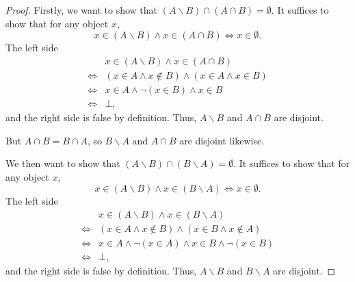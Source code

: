 \begin{proof}
    Firstly, we want to show that $(A\backslash B)\cap (A\cap B)=\emptyset$. It suffices to show that for any object $x$, \[x\in (A\backslash B) \land x \in (A\cap B) \iff x \in \emptyset.\] The left side 
    \begin{align*}
        & x\in (A\backslash B) \land x \in (A\cap B)
        \\\iff& (x\in A \land x \notin B) \land (x\in A \land x\in B)
        \\\iff& x\in A \land \lnot (x\in B) \land x\in B
        \\\iff& \bot,
    \end{align*}
    and the right side is false by definition. Thus, $A\backslash B$ and $A\cap B$ are disjoint.

    But $A\cap B = B\cap A$, so $B\backslash A$ and $A\cap B$ are disjoint likewise.

    We then want to show that $(A\backslash B)\cap (B\backslash A)=\emptyset$. It suffices to show that for any object $x$, \[x\in (A\backslash B) \land x \in (B\backslash A) \iff x \in \emptyset.\] The left side
    \begin{align*}
        & x\in (A\backslash B) \land x \in (B \backslash A)
        \\\iff& (x\in A \land x \notin B) \land (x\in B \land x\notin A)
        \\\iff& x\in A \land \lnot(x \in A) \land x\in B \land \lnot(x \in B)
        \\\iff& \bot,
    \end{align*}
    and the right side is false by definition. Thus, $A\backslash B$ and $B\backslash A$ are disjoint.


\end{proof}

